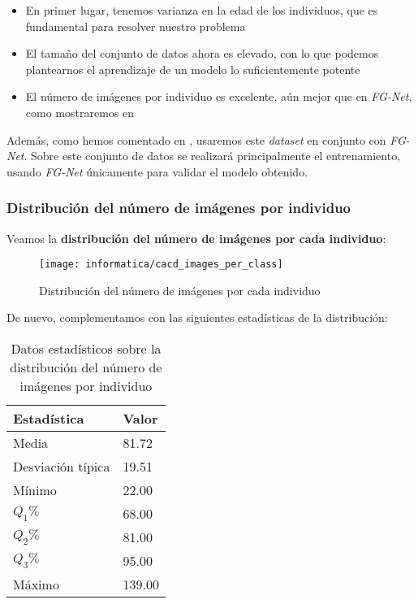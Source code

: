 \begin{itemize}
    \item En primer lugar, tenemos varianza en la edad de los individuos, que es fundamental para resolver nuestro problema
    \item El tamaño del conjunto de datos ahora es elevado, con lo que podemos plantearnos el aprendizaje de un modelo lo suficientemente potente
    \item El número de imágenes por individuo es excelente, aún mejor que en \textit{FG-Net}, como mostraremos en 
\end{itemize}

Además, como hemos comentado en , usaremos este \textit{dataset} en conjunto con \textit{FG-Net}. Sobre este conjunto de datos se realizará principalmente el entrenamiento, usando \textit{FG-Net} únicamente para validar el modelo obtenido.

\subsubsection{Distribución del número de imágenes por individuo} \label{isubsubs:cacd_images_per_indv}

Veamos la \textbf{distribución del número de imágenes por cada individuo}:

\begin{figure}[H]
    \centering
    \texttt{[image: informatica/cacd\_images\_per\_class]}
    \caption{Distribución del número de imágenes por cada individuo}
    \label{img:cacd_distr_images_per_class}
\end{figure}

De nuevo, complementamos con las siguientes estadísticas de la distribución:

\begin{table}[H]
\centering
\begin{tabular}{|l|l|}
    \hline
    \textbf{Estadística} & \textbf{Valor} \\
    \hline

    Media             & 81.72  \\
    Desviación típica & 19.51  \\
    Mínimo            & 22.00  \\
    $Q_1 \%$          & 68.00  \\
    $Q_2 \%$          & 81.00  \\
    $Q_3 \%$          & 95.00  \\
    Máximo            & 139.00 \\
    \hline

\end{tabular}
\caption{Datos estadísticos sobre la distribución del número de imágenes por individuo}
\end{table}

